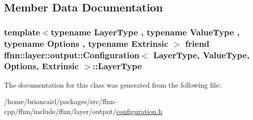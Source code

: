 \subsection{Member Data Documentation}
\hypertarget{classffnn_1_1layer_1_1output_1_1_configuration_a91d957d5fc4cd2f9dcf348096fb013eb}{
\subsubsection[{Layer\-Type}]{\setlength{\rightskip}{0pt plus 5cm}template$<$typename Layer\-Type , typename Value\-Type , typename Options , typename Extrinsic $>$ friend {\bf ffnn\-::layer\-::output\-::\-Configuration}$<$ Layer\-Type, Value\-Type, Options, Extrinsic $>$\-::Layer\-Type}}\label{classffnn_1_1layer_1_1output_1_1_configuration_a91d957d5fc4cd2f9dcf348096fb013eb}


The documentation for this class was generated from the following file\-:\begin{DoxyCompactItemize}
\item 
/home/briancairl/packages/src/ffnn-\/cpp/ffnn/include/ffnn/layer/output/\hyperlink{output_2configuration_8h}{configuration.\-h}\end{DoxyCompactItemize}
